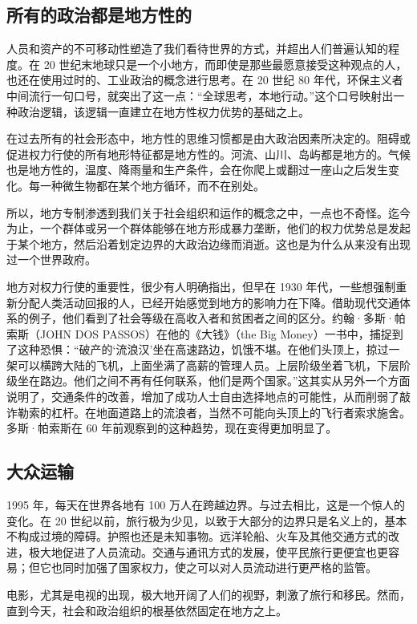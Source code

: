 \subsection{所有的政治都是地方性的}
人员和资产的不可移动性塑造了我们看待世界的方式，并超出人们普遍认知的程度。在 20 世纪末地球只是一个小地方，而即使是那些最愿意接受这种观点的人，也还在使用过时的、工业政治的概念进行思考。在 20 世纪 80 年代，环保主义者中间流行一句口号，就突出了这一点：“全球思考，本地行动。”这个口号映射出一种政治逻辑，该逻辑一直建立在地方性权力优势的基础之上。

在过去所有的社会形态中，地方性的思维习惯都是由大政治因素所决定的。阻碍或促进权力行使的所有地形特征都是地方性的。河流、山川、岛屿都是地方的。气候也是地方性的，温度、降雨量和生产条件，会在你爬上或翻过一座山之后发生变化。每一种微生物都在某个地方循环，而不在别处。

所以，地方专制渗透到我们关于社会组织和运作的概念之中，一点也不奇怪。迄今为止，一个群体或另一个群体能够在地方形成暴力垄断，他们的权力优势总是发起于某个地方，然后沿着划定边界的大政治边缘而消逝。这也是为什么从来没有出现过一个世界政府。

地方对权力行使的重要性，很少有人明确指出，但早在 1930 年代，一些想强制重新分配人类活动回报的人，已经开始感觉到地方的影响力在下降。借助现代交通体系的例子，他们看到了社会等级在高收入者和贫困者之间的区分。约翰·多斯·帕索斯（JOHN DOS PASSOS）在他的《大钱》（the Big Money）一书中，捕捉到了这种恐惧：“破产的‘流浪汉’坐在高速路边，饥饿不堪。在他们头顶上，掠过一架可以横跨大陆的飞机，上面坐满了高薪的管理人员。上层阶级坐着飞机，下层阶级坐在路边。他们之间不再有任何联系，他们是两个国家。”这其实从另外一个方面说明了，交通条件的改善，增加了成功人士自由选择地点的可能性，从而削弱了敲诈勒索的杠杆。在地面道路上的流浪者，当然不可能向头顶上的飞行者索求施舍。多斯·帕索斯在 60 年前观察到的这种趋势，现在变得更加明显了。

\subsection{大众运输}
1995 年，每天在世界各地有 100 万人在跨越边界。与过去相比，这是一个惊人的变化。在 20 世纪以前，旅行极为少见，以致于大部分的边界只是名义上的，基本不构成过境的障碍。护照也还是未知事物。远洋轮船、火车及其他交通方式的改进，极大地促进了人员流动。交通与通讯方式的发展，使平民旅行更便宜也更容易；但它也同时加强了国家权力，使之可以对人员流动进行更严格的监管。

电影，尤其是电视的出现，极大地开阔了人们的视野，刺激了旅行和移民。然而，直到今天，社会和政治组织的根基依然固定在地方之上。



